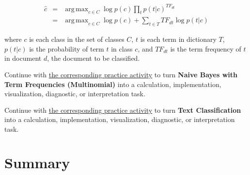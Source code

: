 \documentclass[
  letterpaper,
]{scrbook}
\begin{document}
\[\begin{aligned}
  \hat{c}
  & = & \mathop{\mathrm{arg\,max}}_{c \in C} \log p(c)\prod_{t} p(t|c)^{TF_{dt}} \\
  & = & \mathop{\mathrm{arg\,max}}_{c \in C} \log p(c) + \sum_{t \in T} TF_{dt} \log p(t|c)
\end{aligned}\]

where \(c\) is each class in the set of classes \(C\), \(t\) is each
term in dictionary \(T\), \(p(t|c)\) is the probability of term \(t\) in
class \(c\), and \(TF_{dt}\) is the term frequency of \(t\) in document
\(d\), the document to be classified.

\begin{tcolorbox}[enhanced jigsaw, arc=.35mm, bottomrule=.15mm, bottomtitle=1mm, breakable, colback=white, colbacktitle=quarto-callout-tip-color!10!white, colframe=quarto-callout-tip-color-frame, coltitle=black, left=2mm, leftrule=.75mm, opacityback=0, opacitybacktitle=0.6, rightrule=.15mm, title=\textcolor{quarto-callout-tip-color}{\faLightbulb}\hspace{0.5em}{Put it into practice}, titlerule=0mm, toprule=.15mm, toptitle=1mm]

Continue with
\hyperref[sec-pr-11-naive-bayes-with-term-frequencies-multinomial]{the
corresponding practice activity} to turn \textbf{Naive Bayes with Term
Frequencies (Multinomial)} into a calculation, implementation,
visualization, diagnostic, or interpretation task.

\end{tcolorbox}

\begin{tcolorbox}[enhanced jigsaw, arc=.35mm, bottomrule=.15mm, bottomtitle=1mm, breakable, colback=white, colbacktitle=quarto-callout-tip-color!10!white, colframe=quarto-callout-tip-color-frame, coltitle=black, left=2mm, leftrule=.75mm, opacityback=0, opacitybacktitle=0.6, rightrule=.15mm, title=\textcolor{quarto-callout-tip-color}{\faLightbulb}\hspace{0.5em}{Put it into practice}, titlerule=0mm, toprule=.15mm, toptitle=1mm]

Continue with \hyperref[sec-pr-11-text-classification]{the corresponding
practice activity} to turn \textbf{Text Classification} into a
calculation, implementation, visualization, diagnostic, or
interpretation task.

\end{tcolorbox}

\section*{Summary}\label{text-summary}
\end{document}
